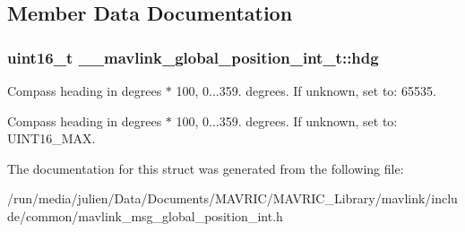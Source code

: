 \subsection{Member Data Documentation}
\hypertarget{struct____mavlink__global__position__int__t_a60f7c02018c444cdffb6121dee854e19}{
\subsubsection[{hdg}]{\setlength{\rightskip}{0pt plus 5cm}uint16\+\_\+t \+\_\+\+\_\+mavlink\+\_\+global\+\_\+position\+\_\+int\+\_\+t\+::hdg}}\label{struct____mavlink__global__position__int__t_a60f7c02018c444cdffb6121dee854e19}


Compass heading in degrees $\ast$ 100, 0...359. degrees. If unknown, set to\+: 65535. 

Compass heading in degrees $\ast$ 100, 0...359. degrees. If unknown, set to\+: U\+I\+N\+T16\+\_\+\+M\+A\+X. 

The documentation for this struct was generated from the following file\+:\begin{DoxyCompactItemize}
\item 
/run/media/julien/\+Data/\+Documents/\+M\+A\+V\+R\+I\+C/\+M\+A\+V\+R\+I\+C\+\_\+\+Library/mavlink/include/common/mavlink\+\_\+msg\+\_\+global\+\_\+position\+\_\+int.\+h\end{DoxyCompactItemize}
